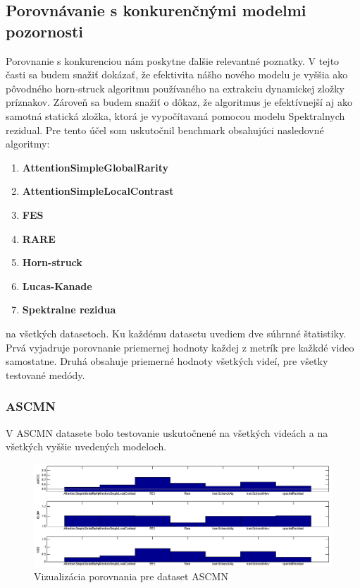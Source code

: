 \subsection{Porovnávanie s konkurenčnými modelmi pozornosti}
Porovnanie s konkurenciou nám poskytne ďalšie relevantné poznatky.
V tejto časti sa budem snažiť dokázať, že efektivita nášho nového modelu je vyššia ako pôvodného horn-struck algoritmu\cite{horn-schunck} používaného na extrakciu dynamickej zložky príznakov.
Zároveň sa budem snažiť o dôkaz, že algoritmus je efektívnejší aj ako samotná statická zložka, ktorá je vypočítavaná pomocou modelu Spektralnych rezidual\cite{spectral-rezidual}.
Pre tento účel som uskutočnil benchmark obsahujúci nasledovné algoritmy:
\begin{enumerate}
  \item\textbf{AttentionSimpleGlobalRarity\cite{global-rarity}}
  \item\textbf{AttentionSimpleLocalContrast\cite{global-rarity}}
  \item\textbf{FES\cite{fes}}
  \item\textbf{RARE\cite{rare-1}}
  \item\textbf{Horn-struck\cite{horn-schunck}}
  \item\textbf{Lucas-Kanade\cite{lucas-kanade}}
  \item\textbf{Spektralne rezidua\cite{spectral-rezidual}}
\end{enumerate}
na všetkých datasetoch.
Ku každému datasetu uvediem dve súhrnné štatistiky.
Prvá vyjadruje porovnanie priemernej hodnoty každej z metrík pre kažkdé video samostatne.
Druhá obsahuje priemerné hodnoty všetkých videí, pre všetky testované medódy.

\subsubsection{ASCMN}
V ASCMN datasete bolo testovanie uskutočnené na všetkých videách a na všetkých vyššie uvedených modeloch.

\begin{figure}[H]
  \includegraphics[width=15cm]{pics/porovnanie-accv-global-new.png}
  \caption{Vizualizácia porovnania pre dataset ASCMN\cite{accv}}
\end{figure}

